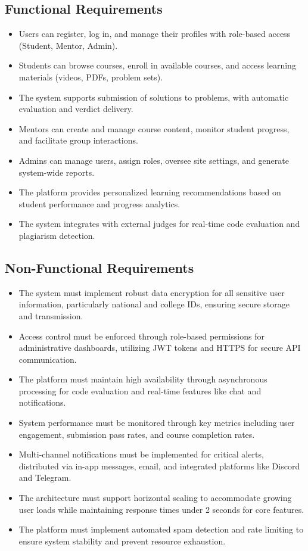 \subsection{Functional Requirements}
\label{subsec:func_reqs}
\begin{itemize}
    \item Users can register, log in, and manage their profiles with role-based access (Student, Mentor, Admin).
    \item Students can browse courses, enroll in available courses, and access learning materials (videos, PDFs, problem sets).
    \item The system supports submission of solutions to problems, with automatic evaluation and verdict delivery.
    \item Mentors can create and manage course content, monitor student progress, and facilitate group interactions.
    \item Admins can manage users, assign roles, oversee site settings, and generate system-wide reports.
    \item The platform provides personalized learning recommendations based on student performance and progress analytics.
    \item The system integrates with external judges for real-time code evaluation and plagiarism detection.
\end{itemize}

\subsection{Non-Functional Requirements}
\label{subsec:non_func_reqs}
\begin{itemize}
    \item The system must implement robust data encryption for all sensitive user information, particularly national and college IDs, ensuring secure storage and transmission.
    \item Access control must be enforced through role-based permissions for administrative dashboards, utilizing JWT tokens and HTTPS for secure API communication.
    \item The platform must maintain high availability through asynchronous processing for code evaluation and real-time features like chat and notifications.
    \item System performance must be monitored through key metrics including user engagement, submission pass rates, and course completion rates.
    \item Multi-channel notifications must be implemented for critical alerts, distributed via in-app messages, email, and integrated platforms like Discord and Telegram.
    \item The architecture must support horizontal scaling to accommodate growing user loads while maintaining response times under 2 seconds for core features.
    \item The platform must implement automated spam detection and rate limiting to ensure system stability and prevent resource exhaustion.
\end{itemize}

